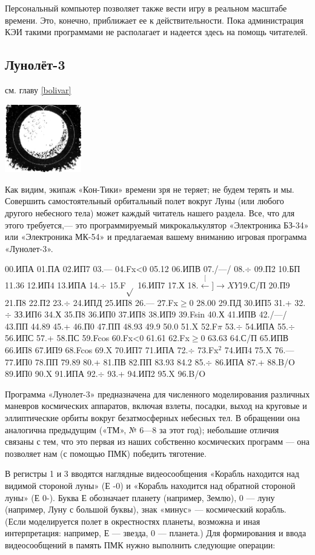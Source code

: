 \documentclass[11pt,a4paper,oneside]{article}
\def\XY{$\stackrel[\leftarrow]{\rightarrow}{XY}$}
\begin{document}
Персональный компьютер позволяет также вести игру в реальном масштабе времени. Это, конечно, приближает ее к действительности. Пока администрация КЭИ такими программами не располагает и надеется здесь на помощь читателей.

\subsection{Лунолёт-3}
см. главу \ref{bolivar}

\includegraphics[width=0.25\textwidth]{bolivar2}

Как видим, экипаж «Кон-Тики» времени зря не теряет; не будем терять и мы. Совершить самостоятельный орбитальный полет вокруг Луны (или любого другого небесного тела) может каждый читатель нашего раздела. Все, что для этого требуется,— это программируемый микрокалькулятор «Электроника БЗ-34» или «Электроника МК-54» и предлагаемая вашему вниманию игровая программа «Лунолет-3».

00.ИПА 01.ПА 02.ИП7 03.— 04.Fx<0 05.12 06.ИПВ 07./—/ 08.$\div$ 09.П2 10.БП 11.36 12.ИП4 13.ИПА 14.$\div$ 15.F$\sqrt{}$
16.ИП7 17.Х 18.\XY 19.С/П 20.П9 21.П8 22.П2 23.$\div$ 24.ИПД 25.ИП8 26.— 27.Fx$\geq$0 28.00 29.ПД 30.ИП5 31.+
32.$\div$ ЗЗ.ИП6 34.Х 35.П8 36.ИП0
37.ИП8 38.ИП9 39.Fsin 40.Х 41.ИПВ
42./—/ 43.ПП 44.89 45.+ 46.П0 47.ПП 48.93 49.9 50.0 51.X 52.F$\pi$ 53.$\div$ 54.ИПА
55.$\div$ 56.ИПС 57.+ 58.ПС 59.Fcos 60.Fx<0 61.61 62.Fx$\geq$0 63.63 64.С/П 65.ИПВ 66.ИП8 67.ИП9 68.Fcos 69.X 70.ИП7 71.ИПА 72.$\div$ 73.Fx$^{2}$ 74.ИП4 75.X 76.— 77.ИП0 78.ПП 79.89 80.+ 81.ПВ 82.ПП 83.93 84.2 85.$\div$ 86.ИПА 87.+ 88.B/O 89.ИП0 90.X 91.ИПА 92.$\div$ 93.+ 94.ИП2 95.X 96.B/O

Программа «Лунолет-3» предназначена для численного моделирования различных маневров космических аппаратов, включая взлеты, посадки, выход на круговые и эллиптические орбиты вокруг безатмосферных небесных тел. В обращении она аналогична предыдущим («ТМ», № 6—8 за этот год); небольшие отличия связаны с тем, что это первая из наших собственно космических программ — она позволяет нам (с помощью ПМК) победить тяготение.

В регистры 1 и 3 вводятся наглядные видеосообщения «Корабль находится над видимой стороной луны» (Е -0) и «Корабль находится над обратной стороной луны» (Е 0-). Буква Е обозначает планету (например, Землю), 0 — луну (например, Луну с большой буквы), знак «минус» — космический корабль. (Если моделируется полет в окрестностях планеты, возможна и иная интерпретация: например, Е — звезда, 0 — планета.) Для формирования и ввода видеосообщений в память ПМК нужно выполнить следующие операции:
\end{document}
